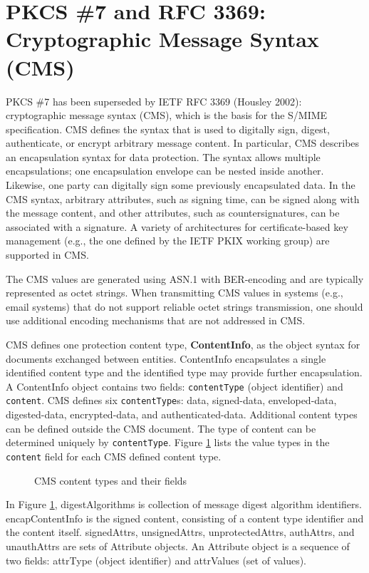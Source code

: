 \documentclass{article}
\begin{document}
\section{PKCS \#7 and RFC 3369: Cryptographic Message Syntax (CMS)}
\label{pkcs7}
PKCS \#7 has been superseded by IETF RFC 3369 (Housley 2002): 
cryptographic message syntax (CMS), which is the basis for the 
S/MIME specification. CMS defines the syntax that is used to
digitally sign, digest, authenticate, or encrypt arbitrary message content.
In particular, CMS describes an encapsulation syntax for data protection. 
The syntax allows multiple encapsulations; one encapsulation envelope 
can be nested inside another. Likewise, one party can digitally sign some
previously encapsulated data. In the CMS syntax, arbitrary attributes,
such as signing time, can be signed along with the message content,
and other attributes, such as countersignatures, can be
associated with a signature. A variety of architectures for 
certificate-based key management (e.g., the one defined
by the IETF PKIX working group) are supported in CMS.

The CMS values are generated using ASN.1 with BER-encoding and are 
typically represented as octet strings. When transmitting 
CMS values in systems (e.g., email systems) that do not support 
reliable octet strings transmission, one should use additional
encoding mechanisms that are not addressed in CMS.

CMS defines one protection content type, {\bf ContentInfo},
as the object syntax for documents exchanged between entities. 
ContentInfo encapsulates a single identified content type and the
identified type may provide further encapsulation. A
ContentInfo object contains two fields:
{\tt contentType} (object identifier) and {\tt content}.
CMS defines six {\tt contentType}s: 
data, signed-data, enveloped-data, digested-data, encrypted-data, 
and authenticated-data.  Additional content types can be defined 
outside the CMS document. The type of content can be
determined uniquely by {\tt contentType}. Figure \ref{pkcs7contenttype}
lists the value types in the {\tt content} field for each CMS defined 
content type.
\begin{center}
\begin{figure}[htb]
\caption{CMS content types and their fields}
\label{pkcs7contenttype}
\end{figure}
\end{center}
In Figure \ref{pkcs7contenttype},  digestAlgorithms is collection 
of message digest algorithm identifiers. encapContentInfo is the 
signed content, consisting of a content
type identifier and the content itself.
signedAttrs, unsignedAttrs, unprotectedAttrs, authAttrs, and unauthAttrs
are sets of Attribute objects. An Attribute object
is a sequence of two fields: attrType (object identifier) and
attrValues (set of values).
\end{document}
